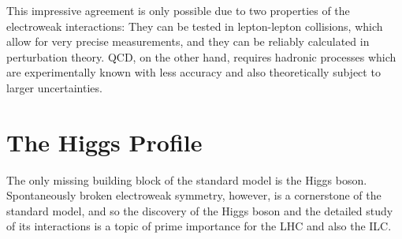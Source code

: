 \documentclass[12pt]{report}
\newcommand{\2}{\ensuremath{\sqrt{2}\,}}
\begin{document}
{      This impressive agreement is only possible due to two properties of the electroweak
      interactions: They can be tested in lepton-lepton collisions, which allow for very
      precise measurements, and they can be reliably calculated in
      perturbation  theory. QCD, on the other hand, requires hadronic processes which are
      experimentally known with less accuracy and also theoretically subject to larger
      uncertainties.
      



  \chapter{The Higgs Profile}
    The only missing building block of the standard model is the Higgs boson. Spontaneously broken
    electroweak symmetry, however, is a cornerstone of the standard model, and so the discovery of
    the Higgs boson and the detailed study of its interactions is a topic of prime importance
    for the LHC and also the ILC.

}
\end{document}
